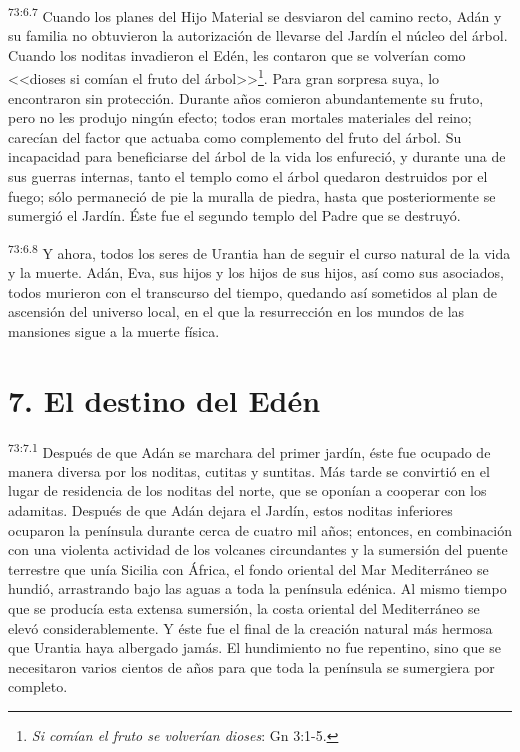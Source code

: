 \par
\textsuperscript{73:6.7} Cuando los planes del Hijo Material se desviaron del camino recto, Adán y su familia no obtuvieron la autorización de llevarse del Jardín el núcleo del árbol. Cuando los noditas invadieron el Edén, les contaron que se volverían como <<dioses si comían el fruto del árbol>>\footnote{\textit{Si comían el fruto se volverían dioses}: Gn 3:1-5.}. Para gran sorpresa suya, lo encontraron sin protección. Durante años comieron abundantemente su fruto, pero no les produjo ningún efecto; todos eran mortales materiales del reino; carecían del factor que actuaba como complemento del fruto del árbol. Su incapacidad para beneficiarse del árbol de la vida los enfureció, y durante una de sus guerras internas, tanto el templo como el árbol quedaron destruidos por el fuego; sólo permaneció de pie la muralla de piedra, hasta que posteriormente se sumergió el Jardín. Éste fue el segundo templo del Padre que se destruyó.

\par
\textsuperscript{73:6.8} Y ahora, todos los seres de Urantia han de seguir el curso natural de la vida y la muerte. Adán, Eva, sus hijos y los hijos de sus hijos, así como sus asociados, todos murieron con el transcurso del tiempo, quedando así sometidos al plan de ascensión del universo local, en el que la resurrección en los mundos de las mansiones sigue a la muerte física.

\section*{7. El destino del Edén}
\par
\textsuperscript{73:7.1} Después de que Adán se marchara del primer jardín, éste fue ocupado de manera diversa por los noditas, cutitas y suntitas. Más tarde se convirtió en el lugar de residencia de los noditas del norte, que se oponían a cooperar con los adamitas. Después de que Adán dejara el Jardín, estos noditas inferiores ocuparon la península durante cerca de cuatro mil años; entonces, en combinación con una violenta actividad de los volcanes circundantes y la sumersión del puente terrestre que unía Sicilia con África, el fondo oriental del Mar Mediterráneo se hundió, arrastrando bajo las aguas a toda la península edénica. Al mismo tiempo que se producía esta extensa sumersión, la costa oriental del Mediterráneo se elevó considerablemente. Y éste fue el final de la creación natural más hermosa que Urantia haya albergado jamás. El hundimiento no fue repentino, sino que se necesitaron varios cientos de años para que toda la península se sumergiera por completo.

